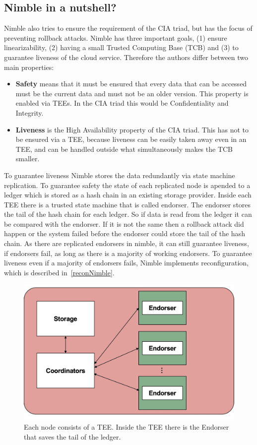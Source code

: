 \subsection{Nimble in a nutshell?}
Nimble also tries to ensure the requirement of the CIA triad, but has the focus of preventing rollback attacks.
Nimble has three important goals, (1) ensure linearizability, (2) having a small Trusted Computing Base (TCB) and (3) to guarantee liveness of the cloud service. Therefore the authors differ between two main properties:
\begin{itemize}
	\item \textbf{Safety} means that it must be ensured that every data that can be accessed must be the current data and must not be an older version. This property is enabled via TEEs. In the CIA triad this would be Confidentiality and Integrity.
	\item \textbf{Liveness} is the High Availability property of the CIA triad. This has not to be ensured via a TEE, because liveness can be easily taken away even in an TEE, and can be handled outside what simultaneously makes the TCB smaller.
\end{itemize}
	To guarantee liveness Nimble stores the data redundantly via state machine replication. To guarantee safety the state of each replicated node is apended to a ledger which is stored as a hash chain in an existing storage provider. Inside each TEE there is a trusted state machine that is called endorser. The endorser stores the tail of the hash chain for each ledger. So if data is read from the ledger it can be compared with the endorser. If it is not the same then a rollback attack did happen or the system failed before the endorser could store the tail of the hash chain. As there are replicated endorsers in nimble, it can still guarantee liveness, if endorsers fail, as long as there is a majority of working endorsers. To guarantee liveness even if a majority of endorsers fails, Nimble implements reconfiguration, which is described in~\ref{reconNimble}. 
\begin{figure}[b]
	\includegraphics[scale=0.12]{pictures/nimble}
	\caption{Each node consists of a TEE. Inside the TEE there is the Endorser that saves the tail of the ledger.}
	\label{nimble}
\end{figure}
